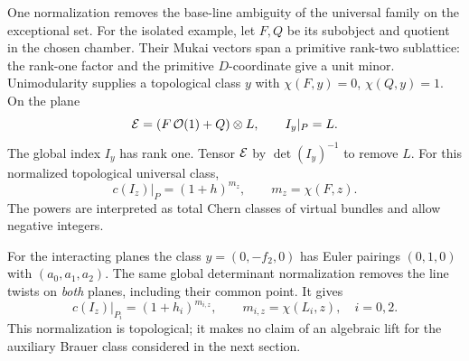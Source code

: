 One normalization removes the base-line ambiguity
of the universal family on the exceptional set.
For the isolated example, let $F,Q$ be its
subobject and quotient in the chosen chamber.
Their Mukai vectors span a primitive rank-two
sublattice: the rank-one factor and the primitive
$D$-coordinate give a unit minor. Unimodularity
supplies a topological class $y$ with
$\chi(F,y)=0$, $\chi(Q,y)=1$. On the plane
\[
 \mathcal E=(F\,\mathcal O(1)+Q)\otimes L,
 \qquad I_y|_P=L.
\]
The global index $I_y$ has rank one. Tensor
$\mathcal E$ by $\det(I_y)^{-1}$ to remove $L$.
For this normalized topological universal class,
\begin{equation}\label{eq:isolated-index-restriction}
 c(I_z)|_P=(1+h)^{m_z},\qquad m_z=\chi(F,z).
\end{equation}
The powers are interpreted as total Chern classes
of virtual bundles and allow negative integers.

For the interacting planes the class
$y=(0,-f_2,0)$ has Euler pairings $(0,1,0)$ with
$(a_0,a_1,a_2)$. The same global determinant
normalization removes the line twists on \emph{both}
planes, including their common point. It gives
\begin{equation}\label{eq:interacting-index-restriction}
 c(I_z)|_{P_i}=(1+h_i)^{m_{i,z}},\qquad
 m_{i,z}=\chi(L_i,z),\quad i=0,2.
\end{equation}
This normalization is topological; it makes no
claim of an algebraic lift for the auxiliary
Brauer class considered in the next section.

